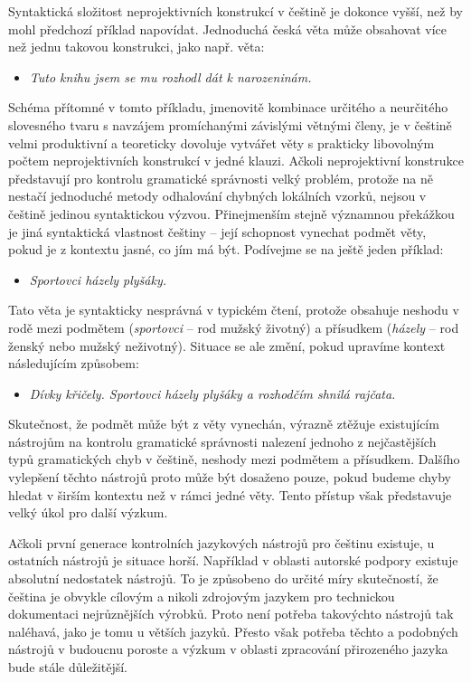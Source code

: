 \begin{multicols}{2}
Syntaktická složitost neprojektivních konstrukcí v češtině je dokonce vyšší, než by mohl předchozí příklad napovídat. Jednoduchá česká věta může obsahovat více než jednu takovou konstrukci, jako např. věta:
\begin{itemize}
\item[] \textit{Tuto knihu jsem se mu rozhodl dát k narozeninám.}
\end{itemize}
Schéma přítomné v tomto příkladu, jmenovitě kombinace určitého a neurčitého slovesného tvaru s navzájem promíchanými závislými větnými členy, je v češtině velmi produktivní a teoreticky dovoluje vytvářet věty s prakticky libovolným počtem neprojektivních konstrukcí v jedné klauzi.
Ačkoli neprojektivní konstrukce představují pro kontrolu gramatické správnosti velký problém, protože na ně nestačí jednoduché metody odhalování chybných lokálních vzorků, nejsou v češtině jedinou syntaktickou výzvou. Přinejmenším stejně významnou překážkou je jiná syntaktická vlastnost češtiny – její schopnost vynechat podmět věty, pokud je z kontextu jasné, co jím má být. Podívejme se na ještě jeden příklad:
\begin{itemize}
\item[]\textit{Sportovci házely plyšáky.}
\end{itemize}
Tato věta je syntakticky nesprávná v typickém čtení, protože obsahuje neshodu v rodě mezi podmětem (\textit{sportovci} – rod mužský životný) a přísudkem (\textit{házely} – rod ženský nebo mužský neživotný). Situace se ale změní, pokud upravíme kontext následujícím způsobem:
\begin{itemize}
\item[]\textit{Dívky křičely. Sportovci házely plyšáky a rozhodčím shnilá rajčata.}
\end{itemize}
Skutečnost, že podmět může být z věty vynechán, výrazně ztěžuje existujícím nástrojům na kontrolu gramatické správnosti nalezení jednoho z nejčastějších typů gramatických chyb v češtině, neshody mezi podmětem a přísudkem. Dalšího vylepšení těchto nástrojů proto může být dosaženo pouze, pokud budeme chyby hledat v širším kontextu než v rámci jedné věty. Tento přístup však představuje velký úkol pro další výzkum.

Ačkoli první generace kontrolních jazykových nástrojů pro češtinu existuje, u ostatních nástrojů je situace horší. Například v oblasti autorské podpory existuje absolutní nedostatek nástrojů. To je způsobeno do určité míry skutečností, že čeština je obvykle cílovým a nikoli zdrojovým jazykem pro technickou dokumentaci nejrůznějších výrobků. Proto není potřeba takovýchto nástrojů tak naléhavá, jako je tomu u větších jazyků. Přesto však potřeba těchto a podobných nástrojů v budoucnu poroste a výzkum v oblasti zpracování přirozeného jazyka bude stále důležitější.
  

\end{multicols}

